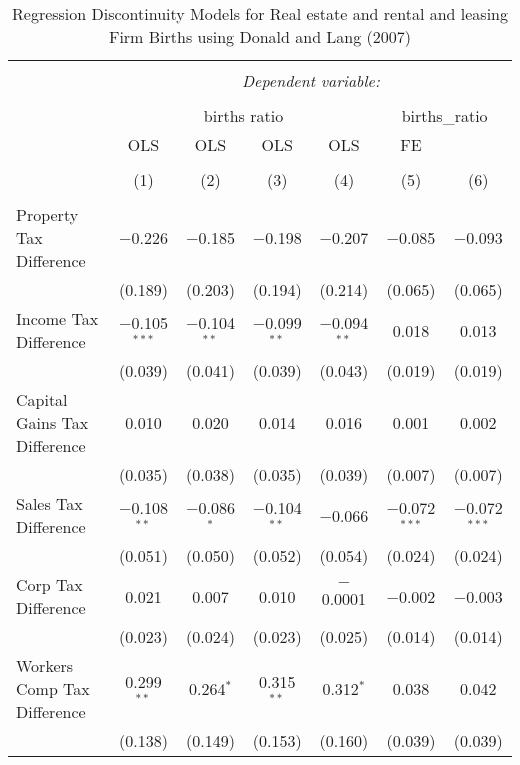 
\begin{table}[!htbp] \centering 
  \caption{Regression Discontinuity Models for  Real estate and rental and leasing Firm Births using Donald and Lang (2007)} 
  \label{} 
\begin{tabular}{@{\extracolsep{5pt}}lcccccc} 
\\[-1.8ex]\hline 
\hline \\[-1.8ex] 
 & \multicolumn{6}{c}{\textit{Dependent variable:}} \\ 
\cline{2-7} 
\\[-1.8ex] & \multicolumn{4}{c}{births ratio} & \multicolumn{2}{c}{births\_ratio} \\ 
 & OLS & OLS & OLS & OLS & FE &  \\ 
\\[-1.8ex] & (1) & (2) & (3) & (4) & (5) & (6)\\ 
\hline \\[-1.8ex] 
 Property Tax Difference & $-$0.226 & $-$0.185 & $-$0.198 & $-$0.207 & $-$0.085 & $-$0.093 \\ 
  & (0.189) & (0.203) & (0.194) & (0.214) & (0.065) & (0.065) \\ 
  Income Tax Difference & $-$0.105$^{***}$ & $-$0.104$^{**}$ & $-$0.099$^{**}$ & $-$0.094$^{**}$ & 0.018 & 0.013 \\ 
  & (0.039) & (0.041) & (0.039) & (0.043) & (0.019) & (0.019) \\ 
  Capital Gains Tax Difference & 0.010 & 0.020 & 0.014 & 0.016 & 0.001 & 0.002 \\ 
  & (0.035) & (0.038) & (0.035) & (0.039) & (0.007) & (0.007) \\ 
  Sales Tax Difference & $-$0.108$^{**}$ & $-$0.086$^{*}$ & $-$0.104$^{**}$ & $-$0.066 & $-$0.072$^{***}$ & $-$0.072$^{***}$ \\ 
  & (0.051) & (0.050) & (0.052) & (0.054) & (0.024) & (0.024) \\ 
  Corp Tax Difference & 0.021 & 0.007 & 0.010 & $-$0.0001 & $-$0.002 & $-$0.003 \\ 
  & (0.023) & (0.024) & (0.023) & (0.025) & (0.014) & (0.014) \\ 
  Workers Comp Tax Difference & 0.299$^{**}$ & 0.264$^{*}$ & 0.315$^{**}$ & 0.312$^{*}$ & 0.038 & 0.042 \\ 
  & (0.138) & (0.149) & (0.153) & (0.160) & (0.039) & (0.039) \\ 

\end{tabular}
\end{table}
